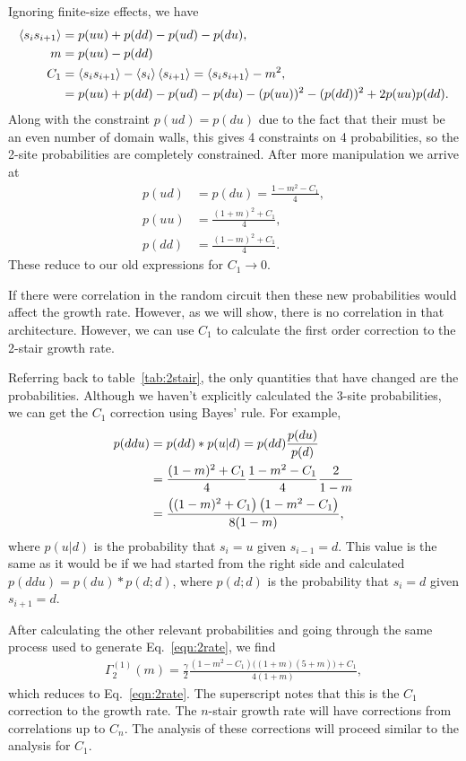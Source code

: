 Ignoring finite-size effects, we have
\begin{align}
\left\langle s_is_{i+1} \right\rangle &= p(uu) + p(dd) - p(ud) - p(du),\nonumber\\
m &= p(uu) - p(dd)\nonumber\\
C_{1} &= \left\langle s_is_{i+1} \right\rangle-\left\langle s_i \right\rangle\left\langle s_{i+1} \right\rangle = \left\langle s_is_{i+1} \right\rangle - m^2,\nonumber\\
&= p(uu) + p(dd) - p(ud) - p(du) - (p(uu))^2 - (p(dd))^2 + 2p(uu)p(dd).
\end{align}
Along with the constraint $p(ud)=p(du)$ due to the fact that their must be an even number of domain walls, this gives 4 constraints on 4 probabilities, so the 2-site probabilities are completely constrained.
After more manipulation we arrive at 
\begin{align}
p(ud) &= p(du) = \frac{1-m^2-C_1}{4},\\
p(uu) &= \frac{(1+m)^2+C_1}{4},\\
p(dd) &= \frac{(1-m)^2+C_1}{4}.
\end{align}
These reduce to our old expressions for $C_1\to0$.

If there were correlation in the random circuit then these new probabilities would affect the growth rate. However, as we will show, there is no correlation in that architecture. However, we can use $C_1$ to calculate the first order correction to the 2-stair growth rate. 

Referring back to table~\ref{tab:2stair}, the only quantities that have changed are the probabilities. Although we haven't explicitly calculated the 3-site probabilities, we can get the $C_1$ correction using Bayes' rule. For example,
\begin{align}
p(ddu) &= p(dd)*p(u|d) = p(dd)\frac{p(du)}{p(d)}\nonumber\\
&= \frac{(1-m)^2+C_1}{4}\frac{1-m^2-C_1}{4}\frac{2}{1-m}\nonumber\\
&= \frac{\left((1-m)^2+C_1\right) \left(1-m^2-C_1\right)}{8 (1-m)},
\end{align}
where $p(u|d)$ is the probability that $s_i=u$ given $s_{i-1}=d$.
This value is the same as it would be if we had started from the right side and calculated $p(ddu) = p(du)*p(d;d)$, where $p(d;d)$ is the probability that $s_i=d$ given $s_{i+1}=d$.

After calculating the other relevant probabilities and going through the same process used to generate Eq.~\ref{eqn:2rate}, we find
\begin{align}
\Gamma_2^{(1)}(m)=\frac{\gamma}{2}\frac{\left(1-m^2-C_1\right) \big((1+m) (5+m)
	\big)+C_1}{4 (1+m)},
\end{align}
which reduces to Eq.~\ref{eqn:2rate}.
The superscript notes that this is the $C_1$ correction to the growth rate. The $n$-stair growth rate will have corrections from correlations up to $C_n$. The analysis of these corrections will proceed similar to the analysis for $C_1$.

